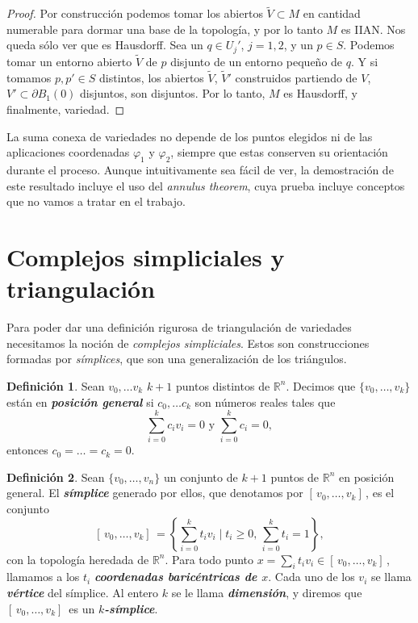 \documentclass[10pt]{report}
\newcommand{\R}{\mathbb{R}}
\newcommand{\enfatiza}[1]{\textbf{\textit{#1}}}
\theoremstyle{definition}
\newtheorem{defin}{Definición}[section]
\begin{document}
\begin{proof}
Por construcción podemos tomar los abiertos $\tilde{V} \subset  M$ en cantidad numerable para dormar una base de la topología, y por lo tanto $M$ es IIAN. Nos queda sólo ver que es Hausdorff. Sea un $q\in U_j'$, $j=1,2$, y  un $p\in S$. Podemos tomar un entorno abierto $\tilde{V}$ de $p$ disjunto de un entorno pequeño de $q$. Y si tomamos $p, p' \in S$ distintos, los abiertos $\tilde{V}$, $\tilde{V}'$ construidos partiendo de $V$, $V'\subset \partial B_1(0)$ disjuntos, son disjuntos. Por lo tanto, $M$ es Hausdorff, y finalmente, variedad.

\end{proof}

La suma conexa de variedades no depende de los puntos elegidos ni de las aplicaciones coordenadas $\varphi_1$ y $\varphi_2$, siempre que estas conserven su orientación durante el proceso. Aunque intuitivamente sea fácil de ver, la demostración de este resultado incluye el uso del \textit{annulus theorem}, cuya prueba incluye conceptos que no vamos a tratar en el trabajo. 






\section{Complejos simpliciales y triangulación}\label{sec:simplices}

Para poder dar una definición rigurosa de triangulación de variedades necesitamos la noción de \textit{complejos simpliciales}. Estos son construcciones formadas por \textit{símplices}, que son una generalización de los triángulos. 

\begin{defin}%
Sean $v_0,\dots v_k$ $k+1$ puntos distintos de $\R^n$. Decimos que $\{ v_0,\dots ,v_k\}$ están en \enfatiza{posición general} si $c_0,\dots c_k$ son números reales tales que  $$\sum_{i=0}^{k}c_iv_i=0 \text{ y } \sum_{i=0}^kc_i=0,$$ entonces $c_0=\dots =c_k=0$.
\end{defin}


\begin{defin}%
Sean $\{ v_0,\dots ,v_n\}$ un conjunto de $k+1$ puntos de $\R^n$ en posición general. El \enfatiza{símplice} generado por ellos, que denotamos por $[ \, v_0,\dots ,v_k ] \,$, es el conjunto $$[ \, v_0,\dots ,v_k] \, =\left\{  \sum_{i=0}^{k}t_iv_i \mid t_i\geq 0,\, \sum_{i=0}^{k}t_i=1 \right\}, $$ con la topología heredada de $\R^n$. Para todo punto $x=\sum_it_iv_i\in [ \, v_0,\dots ,v_k] \,$, llamamos a los $t_i$ \enfatiza{coordenadas baricéntricas de $x$}. Cada uno de los $v_i$ se llama \enfatiza{vértice} del símplice. Al entero $k$ se le llama \enfatiza{dimensión}, y diremos que $[ \, v_0,\dots ,v_k] \,$ es un \enfatiza{$k$-símplice}. 
\end{defin}
\end{document}
